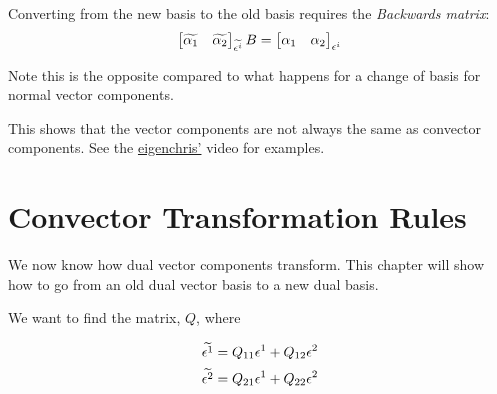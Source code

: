 \documentclass{report}
\begin{document}
Converting from the new basis to the old basis requires the \emph{Backwards matrix}:
$$ \begin{bmatrix} \widetilde{\alpha_1} & \widetilde{\alpha_2} \end{bmatrix}_{\widetilde{\epsilon^i}} B = \begin{bmatrix} \alpha_1 & \alpha_2 \end{bmatrix}_{\epsilon^i}   $$ 

Note this is the opposite compared to what happens for a change of basis for normal vector components.

This shows that the vector components are not always the same as convector components. See the \href{https://youtu.be/rG2q77qunSw?t=512}{eigenchris'} video for examples.

\chapter{Convector Transformation Rules}
We now know how dual vector components transform. This chapter will show how to go from an old dual vector basis to a new dual basis.

We want to find the matrix, $Q$, where

$$ \widetilde{\epsilon^1} = Q_{11}\epsilon^1 + Q_{12}\epsilon^2 $$ 
$$ \widetilde{\epsilon^2} = Q_{21} \epsilon^1 + Q_{22}\epsilon^2 $$ 
\end{document}
